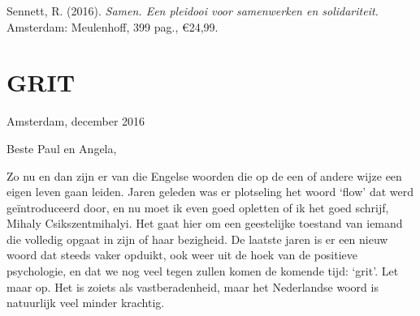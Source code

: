 \documentclass[]{book}
\begin{document}
Sennett, R. (2016). \emph{Samen. Een pleidooi voor samenwerken en
solidariteit.} Amsterdam: Meulenhoff, 399 pag., €24,99.

\hypertarget{grit}{%
\chapter*{GRIT}\label{grit}}

Amsterdam, december 2016

Beste Paul en Angela,

Zo nu en dan zijn er van die Engelse woorden die op de een of andere
wijze een eigen leven gaan leiden. Jaren geleden was er plotseling het
woord `flow' dat werd geïntroduceerd door, en nu moet ik even goed
opletten of ik het goed schrijf, Mihaly Csikszentmihalyi. Het gaat hier
om een geestelijke toestand van iemand die volledig opgaat in zijn of
haar bezigheid. De laatste jaren is er een nieuw woord dat steeds vaker
opduikt, ook weer uit de hoek van de positieve psychologie, en dat we
nog veel tegen zullen komen de komende tijd: `grit'. Let maar op. Het is
zoiets als vastberadenheid, maar het Nederlandse woord is natuurlijk
veel minder krachtig.
\end{document}
